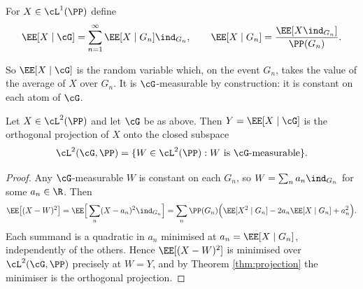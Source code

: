 \begin{definition}
	For $X \in \cL^1(\PP)$ define
	$$
	\EE[X \mid \cG] = \sum_{n=1}^\infty \EE[X\mid G_n]\ind_{G_n}, \qquad \EE[X\mid G_n] = \frac{\EE[X\ind_{G_n}]}{\PP(G_n)}.
	$$
\end{definition}

So $\EE[X\mid\cG]$ is the random variable which, on the event $G_n$, takes the value of the average of $X$ over $G_n$. It is $\cG$-measurable by construction: it is constant on each atom of $\cG$.

\begin{proposition}\label{prop:cond-exp-proj}
	Let $X \in \cL^2(\PP)$ and let $\cG$ be as above. Then $Y = \EE[X\mid\cG]$ is the orthogonal projection of $X$ onto the closed subspace
	$$
	\cL^2(\cG,\PP) = \{ W \in \cL^2(\PP) : W \text{ is } \cG\text{-measurable}\}.
	$$
\end{proposition}
\begin{proof}
	Any $\cG$-measurable $W$ is constant on each $G_n$, so $W = \sum_n a_n \ind_{G_n}$ for some $a_n \in \R$. Then
	$$
	\EE\big[(X-W)^2\big] = \EE\Big[\sum_n (X-a_n)^2\ind_{G_n}\Big] = \sum_n \PP(G_n)\Big( \EE[X^2\mid G_n] - 2a_n\EE[X\mid G_n]+a_n^2\Big).
	$$
	Each summand is a quadratic in $a_n$ minimised at $a_n = \EE[X\mid G_n]$, independently of the others. Hence $\EE[(X-W)^2]$ is minimised over $\cL^2(\cG,\PP)$ precisely at $W = Y$, and by Theorem \ref{thm:projection} the minimiser is the orthogonal projection.
\end{proof}

\begin{center}
\end{center}

